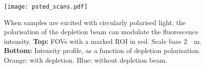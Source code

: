 \begin{figure}
	\centering
	\texttt{[image: psted\_scans.pdf]}
	\caption{
		When samples are excited with circularly polarised light, the polarisation of the depletion beam can modulate the fluorescence intensity. \textbf{Top:} FOVs with a marked ROI in red. Scale bars \SI{2}{\mu m}. \textbf{Bottom:} Intensity profile, as a function of depletion polarisation. Orange: with depletion. Blue: without depletion beam.
	}
\end{figure}





























